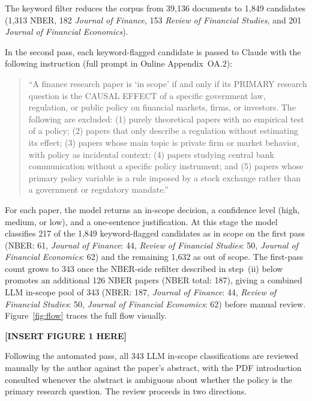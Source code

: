 \documentclass[12pt]{article}
\newcommand{\JF}{\textit{Journal of Finance}}
\newcommand{\RFS}{\textit{Review of Financial Studies}}
\newcommand{\JFE}{\textit{Journal of Financial Economics}}
\begin{document}
The keyword filter reduces the corpus
from 39,136 documents to 1,849 candidates (1,313 NBER, 182 \JF{}, 153
\RFS{}, and 201 \JFE{}).

In the second pass, each keyword-flagged candidate is passed to Claude with
the following instruction (full prompt in Online Appendix~OA.2):
\begin{quote}
``A finance research paper is `in scope' if and only if its
PRIMARY research question is the CAUSAL EFFECT of a specific
government law, regulation, or public policy on financial markets,
firms, or investors.  The following are excluded: (1) purely
theoretical papers with no empirical test of a policy; (2) papers that
only describe a regulation without estimating its effect; (3) papers
whose main topic is private firm or market behavior, with policy as
incidental context; (4) papers studying central bank communication
without a specific policy instrument; and (5) papers whose primary
policy variable is a rule imposed by a stock exchange rather than a
government or regulatory mandate.''
\end{quote}

For each paper, the model returns an in-scope decision, a confidence
level (high, medium, or low), and a one-sentence justification.  At this stage
the model classifies 217 of the 1,849 keyword-flagged candidates as in scope
on the first pass (NBER: 61, \JF{}: 44, \RFS{}: 50, \JFE{}: 62) and the
remaining 1,632 as out of scope.  The first-pass count grows to 343 once the
NBER-side refilter described in step~(ii) below promotes an additional 126
NBER papers (NBER total: 187), giving a combined LLM in-scope pool of 343
(NBER: 187, \JF{}: 44, \RFS{}: 50, \JFE{}: 62) before manual review.
Figure~\ref{fig:flow} traces the full flow visually.

\begin{center}
\textbf{[INSERT FIGURE 1 HERE]}
\end{center}

Following the automated pass, all 343 LLM in-scope classifications are
reviewed manually by the author against the paper's abstract, with the PDF
introduction consulted whenever the abstract is ambiguous about whether the
policy is the primary research question.  The review proceeds in two
directions.
\end{document}
